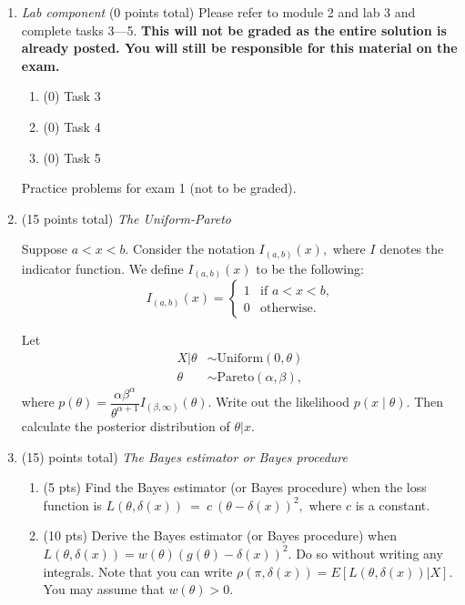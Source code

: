 \documentclass{article}
\begin{document}
\begin{enumerate}
\item {\em Lab component} 
  (0 points total) Please refer to module 2 and lab 3 and complete tasks 3---5. \textbf{This will not be graded as the entire solution is already posted. You will still be responsible for this material on the exam.}
  \begin{enumerate}
  \item (0) Task 3
  \item (0) Task 4
  \item (0) Task 5
  \end{enumerate}
  
  \newpage
  
Practice problems for exam 1 (not to be graded).   
  
\item (15 points total) {\em The Uniform-Pareto}

Suppose $a < x < b.$ Consider the notation
$I_{(a,b)}(x),$ where $I$ denotes the indicator function. We define $I_{(a,b)}(x)$ to be the following:
$$
I_{(a,b)}(x)=
\begin{cases} 
1 & \text{if $a < x < b$,}
\\
0 &\text{otherwise.}
\end{cases}
$$

Let 
\begin{align*}
X|\theta &\sim \text{Uniform}(0,\theta)\\
\theta &\sim \text{Pareto}(\alpha,\beta),
\end{align*}
where $p(\theta) = \dfrac{\alpha \beta^\alpha}{\theta^{\alpha +1}}I_{(\beta,\infty)}(\theta).$
Write out the likelihood $p(x\mid \theta).$ Then calculate the posterior distribution of $\theta|x.$  
  
  
\item (15)  points total) {\em The Bayes estimator or Bayes procedure}
\begin{enumerate}
\item (5 pts) Find the Bayes estimator (or Bayes procedure) when the loss function is  $L(\theta, \delta(x))~=~c~(\theta-\delta(x))^2,$ where $c$ is a constant. 
\item (10 pts) Derive the Bayes estimator (or Bayes procedure) when $L(\theta, \delta(x)) = w(\theta) (g(\theta)-\delta(x))^2.$ Do so without writing any integrals. Note that you can write $\rho(\pi,\delta(x)) =  E[L(\theta,\delta(x))|X].$  You may assume that $w(\theta) > 0.$
\end{enumerate}


\end{enumerate}
\end{document}
